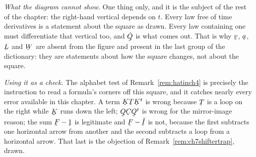 \begin{remark}
\emph{What the diagram cannot show.} One thing only, and it is the
subject of the rest of the chapter: the right-hand vertical depends on
$t$. Every law free of time derivatives is a statement about the square
as drawn. Every law containing one must differentiate that vertical too,
and $\dot\bQ$ is what comes out. That is why $\bv$, $\ba$, $\bL$ and
$\bW$ are absent from the figure and present in the last group of the
dictionary: they are statements about how the square changes, not about
the square.

\emph{Using it as a check.} The alphabet test of
Remark~\ref{rem:hatinch4} is precisely the instruction to read a
formula's corners off this square, and it catches nearly every error
available in this chapter. A term $\bK\bT\bK^{t}$ is wrong because $\bT$
is a loop on the right while $\bK$ runs down the left; $\bQ\bC\bQ^{t}$ is
wrong for the mirror-image reason; the sum $\bF-\shift$ is legitimate and
$\bF-\hI$ is not, because the first subtracts one horizontal arrow from
another and the second subtracts a loop from a horizontal arrow. That
last is the objection of Remark~\ref{rem:ch7shiftertrap}, drawn.
\end{remark}


